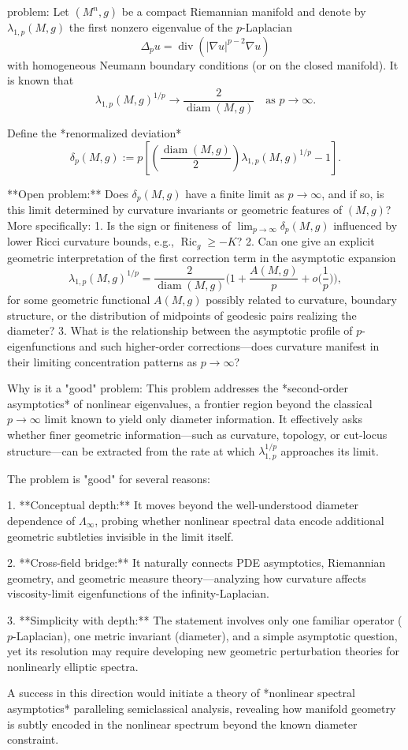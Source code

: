 problem:  
Let \((M^n,g)\) be a compact Riemannian manifold and denote by \(\lambda_{1,p}(M,g)\) the first nonzero eigenvalue of the \(p\)-Laplacian  
\[
\Delta_p u = \operatorname{div}(|\nabla u|^{p-2}\nabla u)
\]
with homogeneous Neumann boundary conditions (or on the closed manifold).  
It is known that  
\[
\lambda_{1,p}(M,g)^{1/p} \to \frac{2}{\operatorname{diam}(M,g)} \quad \text{as } p\to\infty.
\]

Define the *renormalized deviation*  
\[
\delta_p(M,g) := p\left[\left(\frac{\operatorname{diam}(M,g)}{2}\right)\lambda_{1,p}(M,g)^{1/p} - 1\right].
\]

**Open problem:**  
Does \(\delta_p(M,g)\) have a finite limit as \(p \to \infty\), and if so, is this limit determined by curvature invariants or geometric features of \((M,g)\)?  
More specifically:  
1. Is the sign or finiteness of \(\lim_{p\to\infty} \delta_p(M,g)\) influenced by lower Ricci curvature bounds, e.g., \(\operatorname{Ric}_g \ge -K\)?  
2. Can one give an explicit geometric interpretation of the first correction term in the asymptotic expansion
\[
\lambda_{1,p}(M,g)^{1/p} = \frac{2}{\operatorname{diam}(M,g)}\Big(1 + \frac{A(M,g)}{p} + o\Big(\frac{1}{p}\Big)\Big),
\]
for some geometric functional \(A(M,g)\) possibly related to curvature, boundary structure, or the distribution of midpoints of geodesic pairs realizing the diameter?  
3. What is the relationship between the asymptotic profile of \(p\)-eigenfunctions and such higher-order corrections—does curvature manifest in their limiting concentration patterns as \(p\to\infty\)?  

Why is it a "good" problem:  
This problem addresses the *second-order asymptotics* of nonlinear eigenvalues, a frontier region beyond the classical \(p\to\infty\) limit known to yield only diameter information. It effectively asks whether finer geometric information—such as curvature, topology, or cut-locus structure—can be extracted from the rate at which \(\lambda_{1,p}^{1/p}\) approaches its limit.  

The problem is "good" for several reasons:  

1. **Conceptual depth:** It moves beyond the well-understood diameter dependence of \(\Lambda_\infty\), probing whether nonlinear spectral data encode additional geometric subtleties invisible in the limit itself.  

2. **Cross-field bridge:** It naturally connects PDE asymptotics, Riemannian geometry, and geometric measure theory—analyzing how curvature affects viscosity-limit eigenfunctions of the infinity-Laplacian.  

3. **Simplicity with depth:** The statement involves only one familiar operator (\(p\)-Laplacian), one metric invariant (diameter), and a simple asymptotic question, yet its resolution may require developing new geometric perturbation theories for nonlinearly elliptic spectra.  

A success in this direction would initiate a theory of *nonlinear spectral asymptotics* paralleling semiclassical analysis, revealing how manifold geometry is subtly encoded in the nonlinear spectrum beyond the known diameter constraint.